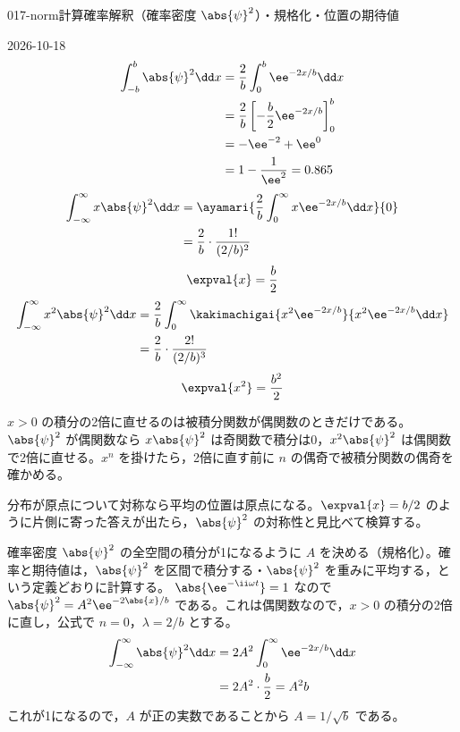\documentclass[uplatex,dvipdfmx,a4paper,11pt]{jsarticle}
\begin{document}
\begin{mondai}{017-norm}{計算}{確率解釈（確率密度 $\abs{\psi}^{2}$）・規格化・位置の期待値}
\begin{kotaeutsushi}{2026-10-18}
\begin{align*}
\int_{-b}^{b}\abs{\psi}^{2}\dd x&=\frac{2}{b}\int_{0}^{b}\ee^{-2x/b}\dd x\\
&=\frac{2}{b}\left[-\frac{b}{2}\ee^{-2x/b}\right]_{0}^{b}\\
&=-\ee^{-2}+\ee^{0}\\
&=1-\frac{1}{\ee^{2}}=0.865
\end{align*}
\begin{align*}
\int_{-\infty}^{\infty}x\abs{\psi}^{2}\dd x&=\ayamari{\frac{2}{b}\int_{0}^{\infty}x\ee^{-2x/b}\dd x}{0}\\
&=\frac{2}{b}\cdot\frac{1!}{(2/b)^{2}}
\end{align*}
\[ \expval{x}=\frac{b}{2} \]
\begin{align*}
\int_{-\infty}^{\infty}x^{2}\abs{\psi}^{2}\dd x&=\frac{2}{b}\int_{0}^{\infty}\kakimachigai{x^{2}\ee^{-2x/b}}{x^{2}\ee^{-2x/b}\dd x}\\
&=\frac{2}{b}\cdot\frac{2!}{(2/b)^{3}}
\end{align*}
\[ \expval{x^{2}}=\frac{b^{2}}{2} \]
\end{kotaeutsushi}
\begin{kizuki}
\item $x>0$ の積分の2倍に直せるのは被積分関数が偶関数のときだけである。$\abs{\psi}^{2}$ が偶関数なら $x\abs{\psi}^{2}$ は奇関数で積分は0，$x^{2}\abs{\psi}^{2}$ は偶関数で2倍に直せる。$x^{n}$ を掛けたら，2倍に直す前に $n$ の偶奇で被積分関数の偶奇を確かめる。
\item 分布が原点について対称なら平均の位置は原点になる。$\expval{x}=b/2$ のように片側に寄った答えが出たら，$\abs{\psi}^{2}$ の対称性と見比べて検算する。
\end{kizuki}
\begin{tadashii}
\houshin 確率密度 $\abs{\psi}^{2}$ の全空間の積分が1になるように $A$ を決める（規格化）。確率と期待値は，$\abs{\psi}^{2}$ を区間で積分する・$\abs{\psi}^{2}$ を重みに平均する，という定義どおりに計算する。
\keisan {} $\abs{\ee^{-\ii\omega t}}=1$ なので $\abs{\psi}^{2}=A^{2}\ee^{-2\abs{x}/b}$ である。これは偶関数なので，$x>0$ の積分の2倍に直し，公式で $n=0$，$\lambda=2/b$ とする。
\begin{align*}
  \int_{-\infty}^{\infty}\abs{\psi}^{2}\dd x
  &=2A^{2}\int_{0}^{\infty}\ee^{-2x/b}\dd x\\
  &=2A^{2}\cdot\frac{b}{2}=A^{2}b
\end{align*}
これが1になるので，$A$ が正の実数であることから $A=1/\sqrt{b}$ である。


\end{tadashii}
\end{mondai}
\end{document}
